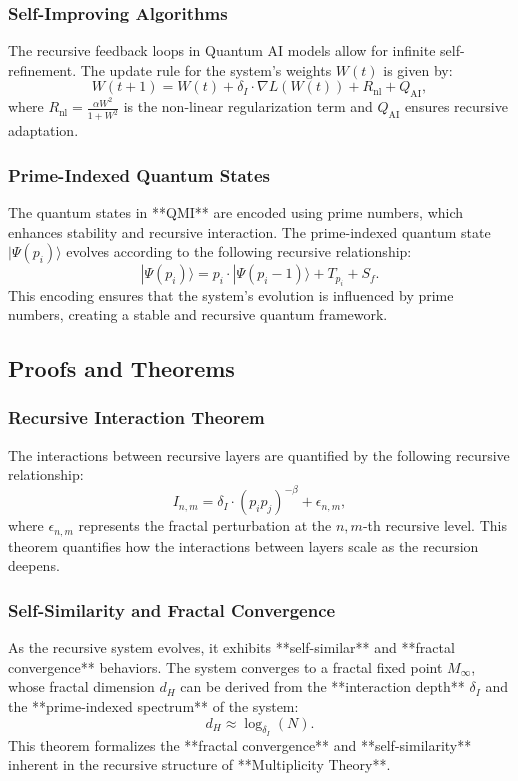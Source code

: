\documentclass[12pt]{article}
\begin{document}
\subsubsection{Self-Improving Algorithms}
The recursive feedback loops in Quantum AI models allow for infinite self-refinement. The update rule for the system's weights \( W(t) \) is given by:
\[
W(t+1) = W(t) + \delta_I \cdot \nabla L(W(t)) + R_\text{nl} + Q_\text{AI},
\]
where \( R_\text{nl} = \frac{\alpha W^2}{1 + W^2} \) is the non-linear regularization term and \( Q_\text{AI} \) ensures recursive adaptation.

\subsubsection{Prime-Indexed Quantum States}
The quantum states in **QMI** are encoded using prime numbers, which enhances stability and recursive interaction. The prime-indexed quantum state \( |\Psi(p_i)\rangle \) evolves according to the following recursive relationship:
\[
|\Psi(p_i)\rangle = p_i \cdot |\Psi(p_i-1)\rangle + T_{p_i} + S_f.
\]
This encoding ensures that the system's evolution is influenced by prime numbers, creating a stable and recursive quantum framework.

\subsection{Proofs and Theorems}

\subsubsection{Recursive Interaction Theorem}
The interactions between recursive layers are quantified by the following recursive relationship:
\[
I_{n,m} = \delta_I \cdot (p_i p_j)^{-\beta} + \epsilon_{n,m},
\]
where \( \epsilon_{n,m} \) represents the fractal perturbation at the \( n, m \)-th recursive level. This theorem quantifies how the interactions between layers scale as the recursion deepens.
\subsubsection{Self-Similarity and Fractal Convergence}
As the recursive system evolves, it exhibits **self-similar** and **fractal convergence** behaviors. The system converges to a fractal fixed point \( M_\infty \), whose fractal dimension \( d_H \) can be derived from the **interaction depth** \( \delta_I \) and the **prime-indexed spectrum** of the system:
\[
d_H \approx \log_{\delta_I}(N).
\]
This theorem formalizes the **fractal convergence** and **self-similarity** inherent in the recursive structure of **Multiplicity Theory**.
\end{document}
